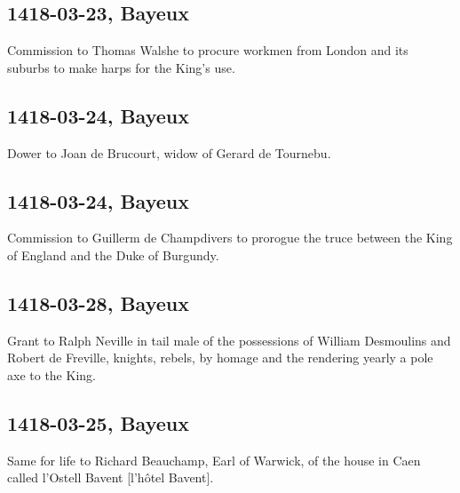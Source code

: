 \documentclass[a4paper,12pt,twoside]{book}
\begin{document}
                
                \subsection{1418-03-23, Bayeux}
                
                
                  Commission to Thomas Walshe to procure workmen from London and its suburbs to make harps for the King's use.
               
                
                \subsection{1418-03-24, Bayeux}
                
                
                  Dower to Joan de Brucourt, widow of Gerard de Tournebu.
               
                
                \subsection{1418-03-24, Bayeux}
                
                
                  Commission to Guillerm de Champdivers to prorogue the truce between the King of England and the Duke of Burgundy.
               
                
                \subsection{1418-03-28, Bayeux}
                
                
                  Grant to Ralph Neville in tail male of the possessions of William Desmoulins and Robert de Freville, knights, rebels, by homage and the rendering yearly a pole axe to the King.
               
                
                \subsection{1418-03-25, Bayeux}
                
                
                  Same for life to Richard Beauchamp, Earl of Warwick, of the house in Caen called l'Ostell Bavent [l’hôtel Bavent].
               
\end{document}
